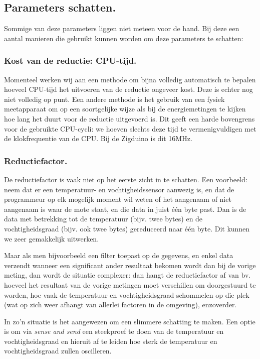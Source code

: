 \documentclass[11pt]{article}
\begin{document}
\subsection{Parameters schatten.} Sommige van deze parameters liggen niet meteen
voor de hand. Bij deze een aantal manieren die gebruikt kunnen worden om deze
parameters te schatten:

\subsubsection{Kost van de reductie: CPU-tijd.} Momenteel werken wij aan een
methode om bijna volledig automatisch te bepalen hoeveel CPU-tijd het uitvoeren
van de reductie ongeveer kost. Deze is echter nog niet volledig op punt. Een
andere methode is het gebruik van een fysiek meetapparaat om op een soortgelijke
wijze als bij de energiemetingen te kijken hoe lang het duurt voor de reductie
uitgevoerd is. Dit geeft een harde bovengrens voor de gebruikte CPU-cycli: we
hoeven slechts deze tijd te vermenigvuldigen met de klokfrequentie van de
CPU. Bij de Zigduino is dit 16MHz.

\subsubsection{Reductiefactor.} De reductiefactor is vaak
niet op het eerste zicht in te schatten. Een voorbeeld: neem dat er een
temperatuur- en vochtigheidssensor aanwezig is, en dat de programmeur op elk mogelijk moment
 wil weten of het aangenaam of niet aangenaam is waar de mote staat, en die data
in juist één byte past. Dan is de data met betrekking tot de temperatuur (bijv.
twee bytes) en de vochtigheidsgraad (bijv. ook twee bytes) gereduceerd naar
\'e\'en byte. Dit kunnen we zeer gemakkelijk uitwerken.

Maar als men bijvoorbeeld een filter toepast op de gegevens, en enkel data
verzendt wanneer een significant ander resultaat bekomen wordt dan bij de vorige
meting, dan wordt de situatie complexer: dan hangt de reductiefactor af van bv.
hoeveel het resultaat van de vorige metingen moet verschillen om doorgestuurd te
worden, hoe vaak de temperatuur en vochtigheidsgraad schommelen op die plek (wat
op zich weer afhangt van allerlei factoren in de omgeving), enzoverder.

In zo'n situatie is het aangewezen om een slimmere schatting te maken. Een optie
is om via \textit{sense and send} een steekproef te doen van de temperatuur en
vochtigheidsgraad en hieruit af te leiden hoe sterk de temperatuur en
vochtigheidsgraad zullen oscilleren.
\end{document}
